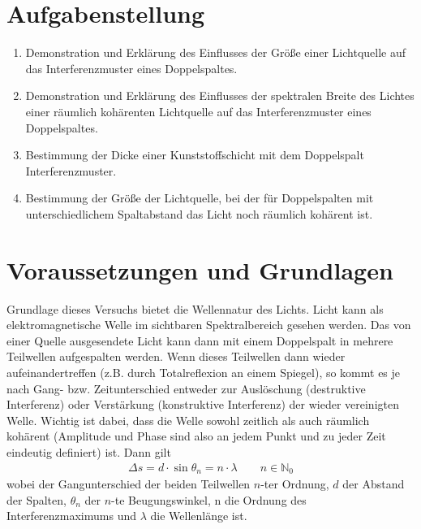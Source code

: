 \documentclass{article}
\begin{document}
\parindent0cm




\pagestyle{fancy}

\tableofcontents
\newpage
\section{Aufgabenstellung}

\begin{enumerate}
\item Demonstration und Erklärung des Einflusses der Größe einer Lichtquelle auf das Interferenzmuster eines Doppelspaltes.
\item Demonstration und Erklärung des Einflusses der spektralen Breite des Lichtes einer räumlich kohärenten Lichtquelle auf das Interferenzmuster eines Doppelspaltes.
\item Bestimmung der Dicke einer Kunststoffschicht mit dem Doppelspalt Interferenzmuster.
\item Bestimmung der Größe der Lichtquelle, bei der für Doppelspalten mit unterschiedlichem Spaltabstand das Licht noch räumlich kohärent ist.
\end{enumerate}



\section{Voraussetzungen und Grundlagen}

Grundlage dieses Versuchs bietet die Wellennatur des Lichts. Licht kann als elektromagnetische Welle im sichtbaren Spektralbereich gesehen werden. Das von einer Quelle ausgesendete Licht kann dann mit einem Doppelspalt in mehrere Teilwellen aufgespalten werden. Wenn dieses Teilwellen dann wieder aufeinandertreffen (z.B. durch Totalreflexion an einem Spiegel), so kommt es je nach Gang- bzw. Zeitunterschied entweder zur Auslöschung (destruktive Interferenz) oder Verstärkung (konstruktive Interferenz) der wieder vereinigten Welle. Wichtig ist dabei, dass die Welle sowohl zeitlich als auch räumlich kohärent (Amplitude und Phase sind also an jedem Punkt und zu jeder Zeit eindeutig definiert) ist. Dann gilt
\begin{align}
\Delta s = d \cdot \sin \theta_n = n\cdot \lambda \qquad n\in \mathbb{N}_0
\end{align}
wobei der Gangunterschied der beiden Teilwellen $n$-ter Ordnung, $d$ der Abstand der Spalten, $\theta_n$ der $n$-te Beugungswinkel, n die Ordnung des Interferenzmaximums und $\lambda$ die Wellenlänge ist.
\end{document}

